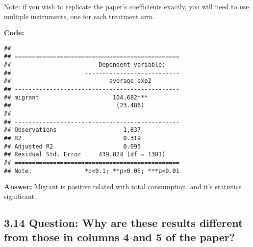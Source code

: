 \documentclass[
]{article}
\newenvironment{Shaded}{\begin{snugshade}}{\end{snugshade}}
\newcommand{\AttributeTok}[1]{\textcolor[rgb]{0.13,0.29,0.53}{#1}}
\newcommand{\CommentTok}[1]{\textcolor[rgb]{0.56,0.35,0.01}{\textit{#1}}}
\newcommand{\ConstantTok}[1]{\textcolor[rgb]{0.56,0.35,0.01}{#1}}
\newcommand{\FunctionTok}[1]{\textcolor[rgb]{0.13,0.29,0.53}{\textbf{#1}}}
\newcommand{\NormalTok}[1]{#1}
\newcommand{\OtherTok}[1]{\textcolor[rgb]{0.56,0.35,0.01}{#1}}
\newcommand{\SpecialCharTok}[1]{\textcolor[rgb]{0.81,0.36,0.00}{\textbf{#1}}}
\newcommand{\StringTok}[1]{\textcolor[rgb]{0.31,0.60,0.02}{#1}}
\begin{document}
Note: if you wish to replicate the paper's coefficients exactly, you
will need to use multiple instruments, one for each treatment arm.

\textbf{Code:}

\begin{Shaded}
\end{Shaded}

\begin{verbatim}
## 
## ===============================================
##                         Dependent variable:    
##                     ---------------------------
##                            average_exp2        
## -----------------------------------------------
## migrant                     104.682***         
##                              (23.486)          
##                                                
## -----------------------------------------------
## Observations                   1,837           
## R2                             0.319           
## Adjusted R2                    0.095           
## Residual Std. Error     439.824 (df = 1381)    
## ===============================================
## Note:               *p<0.1; **p<0.05; ***p<0.01
\end{verbatim}

\textbf{Answer:} Migrant is positive related with total consumption, and
it's statistics significant.

\clearpage

\hypertarget{question-why-are-these-results-different-from-those-in-columns-4-and-5-of-the-paper}{%
\subsection{\texorpdfstring{3.14 \textbf{Question: Why are these results
different from those in columns 4 and 5 of the paper?
}}{3.14 Question: Why are these results different from those in columns 4 and 5 of the paper? }}\label{question-why-are-these-results-different-from-those-in-columns-4-and-5-of-the-paper}}
\end{document}
